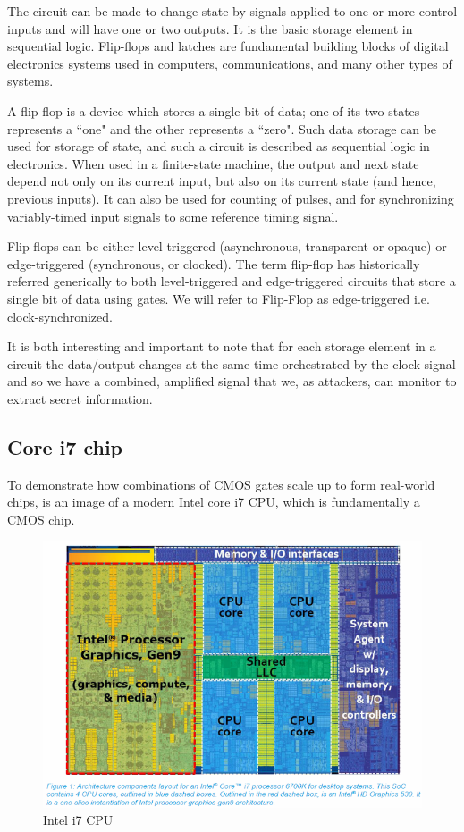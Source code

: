 The circuit can be made to change state by signals applied to one or more
control inputs and will have one or two outputs. It is the basic storage element
in sequential logic. Flip-flops and latches are fundamental building blocks of
digital electronics systems used in computers, communications, and many other
types of systems.

A flip-flop is a device which stores a single bit of data; one of
its two states represents a ``one" and the other represents a ``zero". Such data
storage can be used for storage of state, and such a circuit is described as
sequential logic in electronics. When used in a finite-state machine, the output
and next state depend not only on its current input, but also on its current
state (and hence, previous inputs). It can also be used for counting of pulses,
and for synchronizing variably-timed input signals to some reference timing
signal.

Flip-flops can be either level-triggered (asynchronous, transparent or opaque)
or edge-triggered (synchronous, or clocked). The term flip-flop has historically
referred generically to both level-triggered and edge-triggered circuits that
store a single bit of data using gates. We will refer to Flip-Flop as
edge-triggered i.e. clock-synchronized.

It is both interesting and important to note that for each storage element in a circuit
the data/output changes at the same time orchestrated by the clock signal and so we have a combined, amplified signal that we, as attackers, can monitor to extract secret information.

 \subsection {Core i7 chip}
 To demonstrate how combinations of CMOS gates scale up to form real-world chips,  is an image of a modern Intel core i7 CPU, which is fundamentally a CMOS chip.

\begin{figure}[!ht]
	\centering
	\includegraphics[width=1.0\textwidth]{images/i7.png}
	\caption{Intel i7 CPU} \label{fig:i7}
\end{figure}

